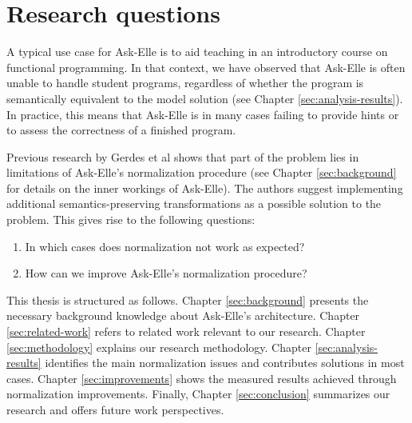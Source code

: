 \section{Research questions}
\label{sec:research-questions}

A typical use case for Ask-Elle is to aid teaching in an introductory course on functional programming. In that context, we have observed that Ask-Elle is often unable to handle student programs, regardless of whether the program is semantically equivalent to the model solution (see Chapter \ref{sec:analysis-results}). In practice, this means that Ask-Elle is in many cases failing to provide hints or to assess the correctness of a finished program.

Previous research by Gerdes et al \cite{2010askelle, 2017askelle} shows that part of the problem lies in limitations of Ask-Elle's normalization procedure (see Chapter \ref{sec:background} for details on the inner workings of Ask-Elle). The authors suggest implementing additional semantics-preserving transformations as a possible solution to the problem. This gives rise to the following questions:

\begin{enumerate}
    \item In which cases does normalization not work as expected?
    \item How can we improve Ask-Elle's normalization procedure?
\end{enumerate}

This thesis is structured as follows. Chapter \ref{sec:background} presents the necessary background knowledge about Ask-Elle's architecture. Chapter \ref{sec:related-work} refers to related work relevant to our research. Chapter \ref{sec:methodology} explains our research methodology. Chapter \ref{sec:analysis-results} identifies the main normalization issues and contributes solutions in most cases. Chapter \ref{sec:improvements} shows the measured results achieved through normalization improvements. Finally, Chapter \ref{sec:conclusion} summarizes our research and offers future work perspectives.


